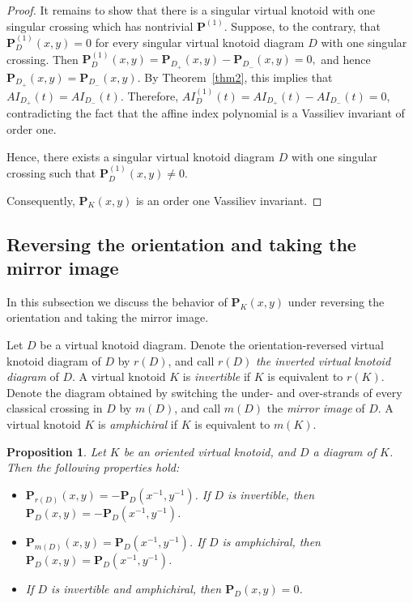 \documentclass[12pt]{amsart}
\theoremstyle{noparens}
\newtheorem{proposition}{Proposition}[section]
\numberwithin{equation}{section}
\numberwithin{equation}{section}
\begin{document}
\begin{proof}
	It remains to show that there is a singular virtual knotoid with one singular crossing which has nontrivial $\mathbf P^{(1)}$. Suppose, to the contrary, that $\mathbf P^{(1)}_D(x,y)=0$ for every singular virtual knotoid diagram $D$ with one singular crossing. Then
	$\mathbf P_D^{(1)}(x,y)=\mathbf P_{D_+}(x,y)-\mathbf P_{D_-}(x,y) =0,$	
	and hence $\mathbf P_{D_+}(x,y)=\mathbf P_{D_-}(x,y)$. By Theorem~\ref{thm2}, this implies that $AI_{D_+}(t)=AI_{D_-}(t)$. Therefore, $AI_D^{(1)}(t)=AI_{D_+}(t)-AI_{D_-}(t) =0$, contradicting the fact that the affine index polynomial is a Vassiliev invariant of order one.
	
	Hence, there exists a singular virtual knotoid diagram $D$ with one singular crossing such that $ \mathbf P^{(1)}_D(x,y)\neq0$. 
	
	Consequently, $\mathbf P_K(x,y)$ is an order one Vassiliev invariant.
\end{proof}		



\subsection{Reversing the orientation and taking the mirror image}
In this subsection we discuss the behavior of $\mathbf{P}_K(x,y)$ under reversing the orientation and taking the mirror image.

Let $D$ be a virtual knotoid diagram. Denote the orientation-reversed virtual knotoid diagram of $D$ by $r(D)$, and call $r(D)$ \textit{the inverted virtual knotoid diagram} of $D$. A virtual knotoid $K$ is \textit{invertible} if $K$ is equivalent to $r(K)$. Denote the diagram obtained by switching the under- and over-strands of every classical crossing in $D$ by $m(D)$, and call $m(D)$ the \textit{mirror image} of $D$. A virtual knotoid $K$ is \textit{amphichiral} if $K$ is equivalent to $m(K)$.

\begin{proposition} \label{prop3.1}
	Let $K$ be an oriented virtual knotoid, and $D$ a diagram of $K$. Then the following properties hold:	
	\begin{itemize}
		\item[{(1)}]
		$\mathbf{P}_{r(D)}(x,y)= -\mathbf{P}_D(x^{-1},y^{-1})$. If $D$ is invertible, then $\mathbf{P}_{D}(x,y)=-\mathbf{P}_{D}(x^{-1},y^{-1})$.
		\item[{(2)}]
		$\mathbf{P}_{m(D)}(x,y)= \mathbf{P}_{D}(x^{-1},y^{-1})$. If $D$ is amphichiral, then $\mathbf{P}_D(x,y)= \mathbf{P}_D(x^{-1},y^{-1})$.
		\item[{(3)}]
		If $D$ is invertible and amphichiral, then $\mathbf{P}_D (x,y)=0$.
	\end{itemize}
\end{proposition}
\end{document}
